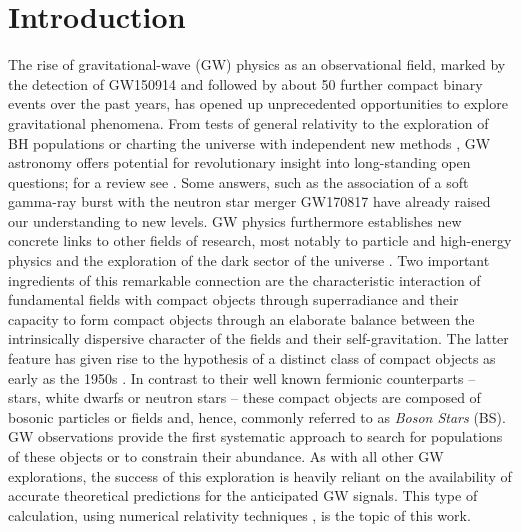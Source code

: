 \documentclass[]{iopart}
\begin{document}
\section{Introduction}
\label{sec:intro}

The rise of gravitational-wave (GW) physics as an observational
field, marked by the detection of GW150914 \cite{Abbott:2016blz}
and followed by about 50 further compact binary events
\cite{LIGOScientific:2018mvr,LIGOScientific:2020ibl} over the past
years, has opened up unprecedented opportunities to explore
gravitational phenomena. From tests of general relativity
\cite{Berti:2015itd,TheLIGOScientific:2016src,Abbott:2018lct,LIGOScientific:2019fpa,LIGOScientific:2020tif,Moore:2021eok}
to the exploration of BH populations
\cite{Trifiro:2015zda,Belczynski:2017gds,LIGOScientific:2020kqk,Baibhav:2020xdf,Gerosa:2021mno}
or charting the universe with independent new methods
\cite{LIGOScientific:2017adf,LIGOScientific:2019zcs}, GW astronomy
offers potential for revolutionary insight into long-standing open
questions; for a review see \cite{Barack:2018yly}. Some answers,
such as the association of a soft gamma-ray burst with the neutron
star merger GW170817 \cite{TheLIGOScientific:2017qsa,Monitor:2017mdv}
have already raised our understanding to new levels. GW physics
furthermore establishes new concrete links to other fields of
research, most notably to particle and high-energy physics and the
exploration of the dark sector of the universe
\cite{Cardoso:2014uka,Barack:2018yly}. Two important ingredients
of this remarkable connection are the characteristic interaction
of fundamental fields with compact objects through superradiance
\cite{Brito:2015oca} and their capacity to form compact objects
through an elaborate balance between the intrinsically dispersive
character of the fields and their self-gravitation. The latter
feature has given rise to the hypothesis of a distinct class of
compact objects as early as the 1950s \cite{Wheeler:1955zz}. In
contrast to their well known fermionic counterparts -- stars, white
dwarfs or neutron stars -- these compact objects are composed of
bosonic particles or fields and, hence, commonly referred to as
{\em Boson Stars} (BS). GW observations provide the first systematic
approach to search for populations of these objects or to constrain
their abundance. As with all other GW explorations, the success of
this exploration is heavily reliant on the availability of accurate
theoretical predictions for the anticipated GW signals.  This type
of calculation, using numerical relativity techniques
\cite{Baumgarte:2021skc}, is the topic of this work.
\end{document}
